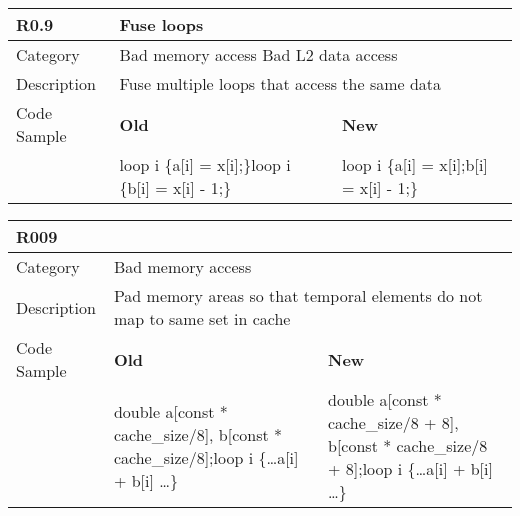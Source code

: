 \begin{tabular}{|p{0.9in}|p{2.0in}|p{2.0in}|} \hline
\textbf{R0.9}       & \multicolumn{2}{|p{4.0in}|}{\textbf{Fuse loops}} \\ \hline
Category            & \multicolumn{2}{|p{4.0in}|}{Bad memory access \newline Bad L2 data access} \\ \hline
Description         & \multicolumn{2}{|p{4.0in}|}{Fuse multiple loops that access the same data} \\ \hline
Code Sample         & \textbf{Old} & \textbf{New} \\ \hline
                    & loop i \{\newline   a[i] = x[i];\newline \}\newline loop i \{\newline   b[i] = x[i] - 1;\newline \}
                    & loop i \{\newline   a[i] = x[i];\newline   b[i] = x[i] - 1;\newline \} \\ \hline
\end{tabular}

\begin{tabular}{|p{0.9in}|p{2.0in}|p{2.0in}|} \hline
\textbf{R009}       & \multicolumn{2}{|p{4.0in}|}{} \\ \hline
Category            & \multicolumn{2}{|p{4.0in}|}{Bad memory access} \\ \hline
Description         & \multicolumn{2}{|p{4.0in}|}{Pad memory areas so that temporal elements do not map to same set in cache} \\ \hline
Code Sample         & \textbf{Old} & \textbf{New} \\ \hline
                    & double a[const * cache\_size/8], b[const * cache\_size/8];\newline loop i \{\newline   \ldots a[i] + b[i] \ldots\newline \}
                    & double a[const * cache\_size/8 + 8], b[const * cache\_size/8 + 8];\newline loop i \{\newline   \ldots a[i] + b[i] \ldots\newline \} \\ \hline
\end{tabular}

